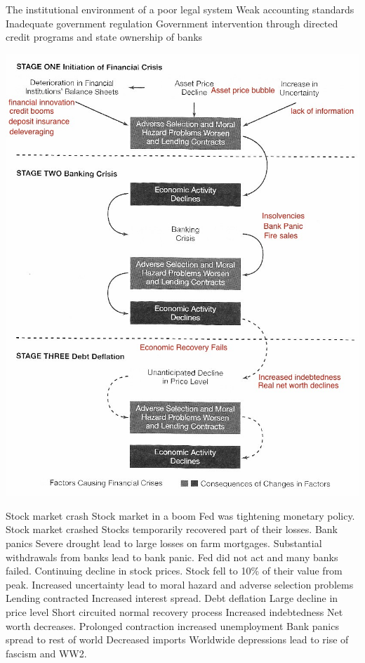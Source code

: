 \documentclass[12pt]{examnotes}
\begin{document}
\ra The institutional environment of a poor legal system
\ra Weak accounting standards 
\ra Inadequate government regulation
\ra Government intervention through directed credit programs and state ownership of banks

\includegraphics[scale=0.5]{./imgs/91.jpg}

 Stock market crash 
\rna Stock market in a boom
\rna Fed was tightening monetary policy.
\rna Stock market crashed
\rna Stocks temporarily recovered part of their losses.
 Bank panics
\rna Severe drought lead to large losses on farm mortgages.
\rna Substantial withdrawals from banks lead to bank panic.
\rna Fed did not act and many banks failed.
 Continuing decline in stock prices.
\rna Stock fell to 10\% of their value from peak.
\rna Increased uncertainty lead to moral hazard and adverse selection problems
\rna Lending contracted
\rna Increased interest spread.
Debt deflation
\rna Large decline in price level
\rna Short circuited normal recovery process
\rna Increased indebtedness 
\rna Net worth decreases.
\rna Prolonged contraction increased unemployment
\ra Bank panics spread to rest of world
\ra Decreased imports
\ra Worldwide depressions lead to rise of fascism and WW2.
\end{document}
